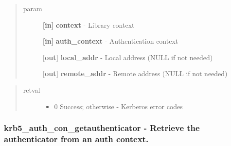 \documentclass[letterpaper,10pt,english]{sphinxmanual}
\begin{document}
\begin{fulllineitems}
\label{appdev/refs/api/krb5_auth_con_getaddrs:krb5_auth_con_getaddrs}
\end{fulllineitems}

\begin{quote}\begin{description}
\item[{param}] \leavevmode
\textbf{{[}in{]}} \textbf{context} - Library context

\textbf{{[}in{]}} \textbf{auth\_context} - Authentication context

\textbf{{[}out{]}} \textbf{local\_addr} - Local address (NULL if not needed)

\textbf{{[}out{]}} \textbf{remote\_addr} - Remote address (NULL if not needed)

\end{description}\end{quote}
\begin{quote}\begin{description}
\item[{retval}] \leavevmode\begin{itemize}
\item {} 
0   Success; otherwise - Kerberos error codes

\end{itemize}

\end{description}\end{quote}


\subsubsection{krb5\_auth\_con\_getauthenticator -  Retrieve the authenticator from an auth context.}
\label{appdev/refs/api/krb5_auth_con_getauthenticator:krb5-auth-con-getauthenticator-retrieve-the-authenticator-from-an-auth-context}\label{appdev/refs/api/krb5_auth_con_getauthenticator::doc}
\end{document}
